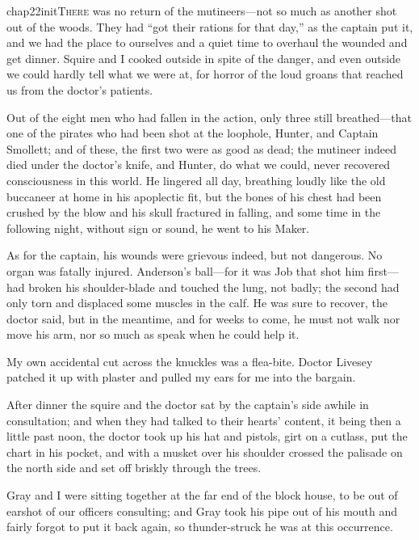 
   \lettrine[lines=4,image=true]{chap22initT}{here} was no return of the mutineers---not so much as another shot out of the woods. They had \enquote{got their rations for that day,} as the captain put it, and we had the place to ourselves and a quiet time to overhaul the wounded and get dinner. Squire and I cooked outside in spite of the danger, and even outside we could hardly tell what we were at, for horror of the loud groans that reached us from the doctor’s patients.

Out of the eight men who had fallen in the action, only three still breathed---that one of the pirates who had been shot at the loophole, Hunter, and Captain Smollett; and of these, the first two were as good as dead; the mutineer indeed died under the doctor’s knife, and Hunter, do what we could, never recovered consciousness in this world. He lingered all day, breathing loudly like the old buccaneer at home in his apoplectic fit, but the bones of his chest had been crushed by the blow and his skull fractured in falling, and some time in the following night, without sign or sound, he went to his Maker.

As for the captain, his wounds were grievous indeed, but not dangerous. No organ was fatally injured. Anderson’s ball---for it was Job that shot him first---had broken his shoulder-blade and touched the lung, not badly; the second had only torn and displaced some muscles in the calf. He was sure to recover, the doctor said, but in the meantime, and for weeks to come, he must not walk nor move his arm, nor so much as speak when he could help it.

My own accidental cut across the knuckles was a flea-bite. Doctor Livesey patched it up with plaster and pulled my ears for me into the bargain.

After dinner the squire and the doctor sat by the captain’s side awhile in consultation; and when they had talked to their hearts’ content, it being then a little past noon, the doctor took up his hat and pistols, girt on a cutlass, put the chart in his pocket, and with a musket over his shoulder crossed the palisade on the north side and set off briskly through the trees.

Gray and I were sitting together at the far end of the block house, to be out of earshot of our officers consulting; and Gray took his pipe out of his mouth and fairly forgot to put it back again, so thunder-struck he was at this occurrence.

